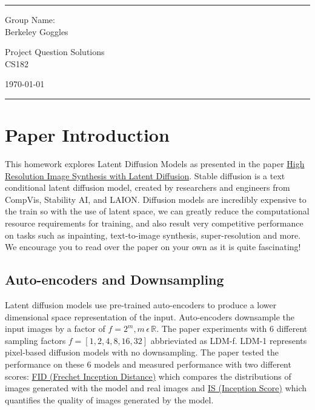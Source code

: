 \documentclass[a4paper]{article}
\begin{document}
\fancyhead[C]{}
\hrule \medskip %
\begin{minipage}{0.295\textwidth} 
\raggedright
\footnotesize
Group Name: \hfill \\
Berkeley Goggles
\end{minipage}
\begin{minipage}{0.4\textwidth} 
\centering 
\large 
Project Question Solutions\\ 
\normalsize 
CS182\\ 
\end{minipage}
\begin{minipage}{0.295\textwidth} 
\raggedleft
\today\hfill\\
\end{minipage}
\medskip\hrule 
\bigskip
\section{Paper Introduction}
This homework explores Latent Diffusion Models as presented in the paper \href{https://arxiv.org/pdf/2112.10752.pdf}{High Resolution Image Synthesis with Latent Diffusion}. Stable diffusion is a text conditional latent diffusion model, created by researchers and engineers from CompVis, Stability AI, and LAION. Diffusion models are incredibly expensive to the train so with the use of latent space, we can greatly reduce the computational resource requirements for training, and also result very competitive performance on tasks such as inpainting, text-to-image synthesis, super-resolution and more. We encourage you to read over the paper on your own as it is quite fascinating!

\subsection{Auto-encoders and Downsampling}
Latent diffusion models use pre-trained auto-encoders to produce a lower dimensional space representation of the input.
Auto-encoders downsample the input images by a factor of \(f=2^m, m  \, \epsilon \, \mathbb{R}\). The paper experiments with 6 different sampling factors \(f=[1, 2, 4, 8, 16, 32]\) abbrieviated as LDM-f. LDM-1 represents pixel-based diffusion models with no downsampling. The paper tested the performance on these 6 models and measured performance with two different scores: \href{https://en.wikipedia.org/wiki/Fr%C3%A9chet_inception_distance}{FID (Frechet Inception Distance)} which compares the distributions of images generated with the model and real images and \href{https://en.wikipedia.org/wiki/Inception_score}{IS (Inception Score)} which quantifies the quality of images generated by the model.
\end{document}

